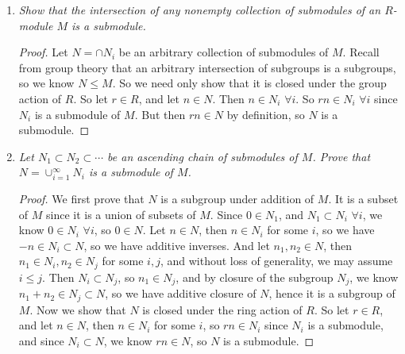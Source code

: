 \documentclass[9pt,reqno,twoside]{amsbook}
\theoremstyle{plain}
\numberwithin{section}{chapter}
\numberwithin{equation}{chapter}
\theoremstyle{definition}
\theoremstyle{remark}
\theoremstyle{plain}
\renewcommand{\leq}{\leqslant}
\begin{document}
\begin{enumerate}[label=\arabic*.]
\begin{proof}
We know $IM$ is nonempty since $I$ contains $0$, so $0m \in IM$, and by exercise 1, we know $0 \in IM$. So let $x,y \in IM$ such that:
$$
x = a_1m_1 + \cdots + a_km_k
$$
$$
y = b_1n_1 + \cdots + b_ln_l
$$
 with $a_i,b_i \in I$, $m_i,n_i \in M$, and let $r \in R$. Then we have the following by the distributive property of scalars in the definition of an $R$-module: 
\begin{equation}
\begin{aligned}
x + ry &= a_1m_1 + \cdots + a_km_k + r(b_1n_1 + \cdots + b_ln_l)\\
&= a_1m_1 + \cdots + a_km_k + rb_1n_1 + \cdots rb_ln_l.
\end{aligned}
\end{equation}
Now since $I$ is a left ideal, we know $rb_i \in I$ since $b_i \in I$, so $x + ry$ is a finite sum of elements of the form $a_im_i$ and so it is in $IM$. Then by the submodule criterion, $IM$ is a submodule of $M$. 
\end{proof}

\vspace{3mm}
\item \textit{Show that the intersection of any nonempty collection of submodules of an $R$-module $M$ is a submodule. }

\begin{proof}
Let $N = \cap N_i$ be an arbitrary collection of submodules of $M$. Recall from group theory that an arbitrary intersection of subgroups is a subgroups, so we know $N \leq M$. So we need only show that it is closed under the group action of $R$. So let $r \in R$, and let $n \in N$. Then $n \in N_i$ $\forall i$. So $rn \in N_i$ $\forall i$ since $N_i$ is a submodule of $M$. But then $rn \in N$ by definition, so $N$ is a submodule. 
\end{proof}

\vspace{3mm}
\item \textit{Let $N_1 \subset N_2 \subset \cdots$ be an ascending chain of submodules of $M$. Prove that $N = \cup_{i = 1}^\infty N_i$ is a submodule of $M$. }

\begin{proof}
We first prove that $N$ is a subgroup under addition of $M$. It is a subset of $M$ since it is a union of subsets of $M$. Since $0 \in N_1$, and $N_1 \subset N_i$ $\forall i$, we know $0 \in N_i$ $\forall i$, so $0 \in N$. Let $n \in N$, then $n \in N_i$ for some $i$, so we have $-n \in N_i \subset N$, so we have additive inverses. And let $n_1,n_2 \in N$, then $n_1 \in N_i,n_2 \in N_j$ for some $i,j$, and without loss of generality, we may assume $i \leq j$. Then $N_i \subset N_j$, so $n_1 \in N_j$, and by closure of the subgroup $N_j$, we know $n_1 + n_2 \in N_j \subset N$, so we have additive closure of $N$, hence it is a subgroup of $M$. Now we show that $N$ is closed under the ring action of $R$. So let $r \in R$, and let $n \in N$, then $n \in N_i$ for some $i$, so $rn \in N_i$ since $N_i$ is a submodule, and since $N_i \subset N$, we know $rn \in N$, so $N$ is a submodule. 
\end{proof}


\end{enumerate}
\end{document}
